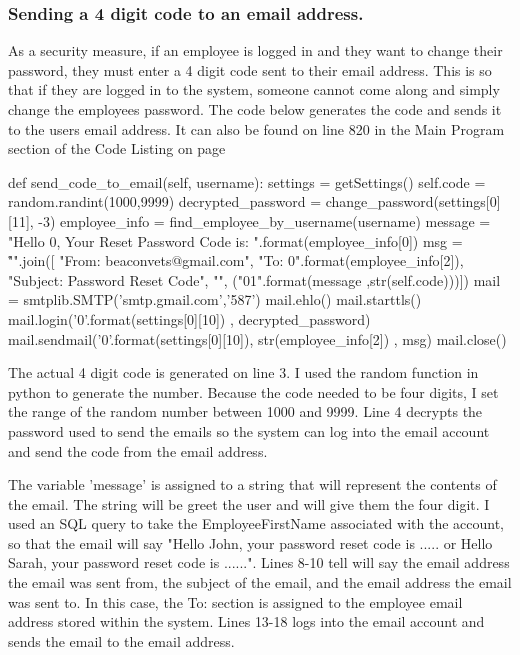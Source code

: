 \pagebreak

\subsubsection{Sending a 4 digit code to an email address.}

As a security measure, if an employee is logged in and they want to change their password, they must enter a 4 digit code sent to their email address. This is so that if they are logged in to the system, someone cannot come along and simply change the employees password. The code below generates the code and sends it to the users email address. It can also be found on line 820 in the Main Program section of the Code Listing on page \pageref{X}

\begin{python}
def send_code_to_email(self, username):
        settings = getSettings()
        self.code = random.randint(1000,9999)
        decrypted_password = change_password(settings[0][11], -3)
        employee_info = find_employee_by_username(username)
        message = "Hello {0}, \n \n Your Reset Password Code is:  ".format(employee_info[0])
        msg = "\r\n".join([
          "From: beaconvets@gmail.com",
          "To: {0}".format(employee_info[2]),
          "Subject: Password Reset Code",
          "",
          ("{0}{1}".format(message ,str(self.code)))])
        mail = smtplib.SMTP('smtp.gmail.com','587')
        mail.ehlo()
        mail.starttls()
        mail.login('{0}'.format(settings[0][10]) , decrypted_password)
        mail.sendmail('{0}'.format(settings[0][10]), str(employee_info[2]) , msg)
        mail.close()
\end{python}

The actual 4 digit code is generated on line 3. I used the random function in python to generate the number. Because the code needed to be four digits, I set the range of the random number between 1000 and 9999. Line 4 decrypts the password used to send the emails so the system can log into the email account and send the code from the email address. 

The variable 'message' is assigned to a string that will represent the contents of the email. The string will be greet the user and will give them the four digit. I used an SQL query to take the EmployeeFirstName associated with the account, so that the email will say "Hello John, your password reset code is ..... or Hello Sarah, your password reset code is ......". Lines 8-10 tell will say the email address the email was sent from, the subject of the email, and the email address the email was sent to. In this case, the To: section is assigned to the employee email address stored within the system. Lines 13-18 logs into the email account and sends the email to the email address.

